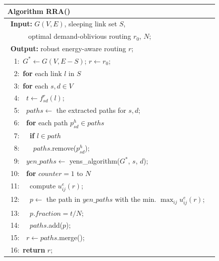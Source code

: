 \documentclass[conference]{IEEEtran}
\begin{document}
\begin{table}[!th]
\begin{tabular}{ll}
\hline
\textbf{Algorithm RRA()}\\
\hline
$\:\:$\textbf{Input:} $G(V,E)$, sleeping link set $S$,\\
$\quad\quad\ \ \ $ optimal demand-oblivious routing $r_0$, $N$;\\
$\:\:$\textbf{Output:} robust energy-aware routing $r$;\\
$\:\:$\ 1:\ $G^* \leftarrow G(V, E-S)$; $r \leftarrow r_0$;\\
$\:\:$\ 2:\ \textbf{for} {each link $l$ in $S$}\\
$\:\:$\ 3:\quad\ \textbf{for} {each $s, d \in V$}\\
$\:\:$\ 4:\quad\ \quad\ $t \leftarrow f^r_{sd}(l)$;\\
$\:\:$\ 5:\quad\ \quad\ $paths \leftarrow$ the extracted paths for $s, d$;\\
$\:\:$\ 6:\quad\ \quad\ \textbf{for} {each path $p^h_{sd} \in paths$}\\
$\:\:$\ 7:\quad\ \quad\ \quad\ \textbf{if} {$l \in path$}\\
$\:\:$\ 8:\quad\ \quad\ \quad\ \quad\ $paths$.remove($p^h_{sd}$); \\
$\:\:$\ 9:\quad\ \quad\ $yen\_paths \leftarrow$ yens\_algorithm($G^*$, $s$, $d$);\\
$\:\:$10:\quad\ \quad\ \textbf{for} {$counter = 1$ to $N$}\\
$\:\:$11:\quad\ \quad\ \quad\ compute $u^e_{ij}(r)$;\\
$\:\:$12:\quad\ \quad\ \quad\ $p \leftarrow$ the path in $yen\_paths$ with the min. $\max_{ij} u^e_{ij}(r)$;\\
$\:\:$13:\quad\ \quad\ \quad\ $p.fraction = t / N$;\\
$\:\:$14:\quad\ \quad\ \quad\ $paths$.add($p$);\\
$\:\:$15:\quad\ \quad\ $r \leftarrow paths$.merge();\\
$\:\:$16:\ \textbf{return} $r$;\\
\hline
\end{tabular}
\end{table}
\end{document}

